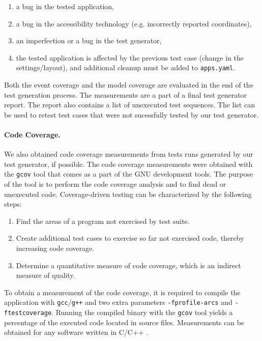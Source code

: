 \begin{enumerate}
    \item a bug in the tested application,
    \item a bug in the accessibility technology (e.g. incorrectly reported coordinates),
    \item an imperfection or a bug in the test generator,
    \item the tested application is affected by the previous test case (change in the settings/layout), and additional cleanup must be added to \texttt{apps.yaml}.
\end{enumerate}

Both the event coverage and the model coverage are evaluated in the end of the test generation process. The measurements are a part of a final test generator report. The report also contains a list of unexecuted test sequences. The list can be used to retest test cases that were not sucessfully tested by our test generator.

\paragraph{Code Coverage.} We also obtained code coverage measurements from tests runs generated by our test generator, if possible. The code coverage measurements were obtained with the \verb|gcov| tool that comes as a part of the GNU development tools. The purpose of the tool is to perform the code coverage analysis and to find dead or unexecuted code. Coverage-driven testing can be characterized by the following steps: 
\begin{enumerate}
  \item Find the areas of a program not exercised by test suite.
  \item Create additional test cases to exercise so far not exercised code, thereby increasing code coverage.
  \item Determine a quantitative measure of code coverage, which is an indirect measure of quality.
\end{enumerate}

To obtain a measurement of the code coverage, it is required to compile the application with \verb|gcc|/\verb|g++| and two extra parameters \verb|-fprofile-arcs| and \verb|-ftestcoverage|. Running the compiled binary with the \verb|gcov| tool yields a percentage of the executed code located in source files. Measurements can be obtained for any software written in C/C++ \cite{gcov}.

